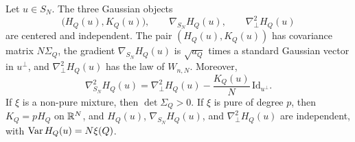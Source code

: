 \begin{lemma}\label{lem:kr-one-point}
Let $u\in S_N$. The three Gaussian objects
\[
\big(H_Q(u),K_Q(u)\big),\qquad \nabla_{S_N}H_Q(u),\qquad \nabla^2_\perp H_Q(u)
\]
are centered and independent. The pair $(H_Q(u),K_Q(u))$ has covariance matrix $N\Sigma_Q$, the gradient $\nabla_{S_N}H_Q(u)$ is $\sqrt{a_Q}$ times a standard Gaussian vector in $u^\perp$, and $\nabla^2_\perp H_Q(u)$ has the law of $W_{n,N}$. Moreover,
\begin{equation}\label{eq:kr-intrinsic}
\nabla^2_{S_N}H_Q(u)=\nabla^2_\perp H_Q(u)-\frac{K_Q(u)}N\,\mathrm{Id}_{u^\perp}.
\end{equation}
If $\xi$ is a non-pure mixture, then $\det\Sigma_Q>0$. If $\xi$ is pure of degree $p$, then $K_Q=pH_Q$ on $\mathbb R^N$, and $H_Q(u)$, $\nabla_{S_N}H_Q(u)$, and $\nabla^2_\perp H_Q(u)$ are independent, with $\operatorname{Var} H_Q(u)=N\xi(Q)$.
\end{lemma}

